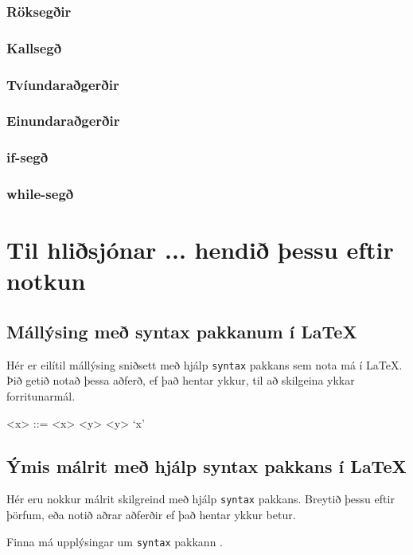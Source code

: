 \documentclass[12pt,a4paper]{article}
\begin{document}
\subsubsection{Röksegðir}
\subsubsection{Kallsegð}
\subsubsection{Tvíundaraðgerðir}
\subsubsection{Einundaraðgerðir}
\subsubsection{if-segð}
\subsubsection{while-segð}
\section{Til hliðsjónar ... hendið þessu eftir notkun}

\subsection{Mállýsing með syntax pakkanum í LaTeX}

Hér er eilítil mállýsing sniðsett með hjálp {\tt syntax} pakkans sem
nota má í \LaTeX. Þið getið notað þessa aðferð, ef það hentar ykkur,
til að skilgeina ykkar forritunarmál.

\begin{grammar}
<x> ::= <x> <y>
	 `x'
\end{grammar}

\subsection{Ýmis málrit með hjálp syntax pakkans í LaTeX}

Hér eru nokkur málrit skilgreind með hjálp {\tt syntax} pakkans.
Breytið þessu eftir þörfum, eða notið aðrar
aðferðir ef það hentar ykkur betur.

Finna má upplýsingar um {\tt syntax} pakkann
.
\end{document}
